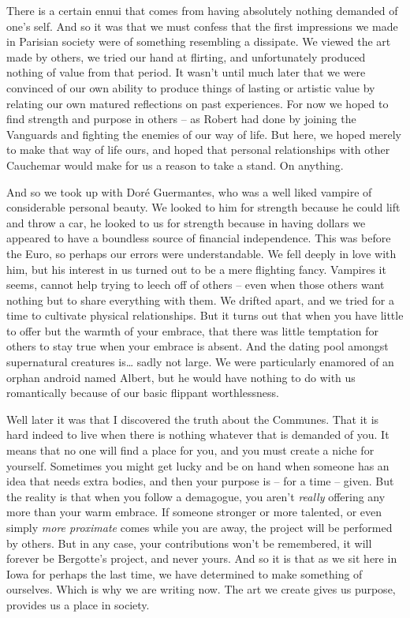 There is a certain ennui that comes from having absolutely nothing demanded of one's self. And so it was that we must confess that the first impressions we made in Parisian society were of something resembling a dissipate. We viewed the art made by others, we tried our hand at flirting, and unfortunately produced nothing of value from that period. It wasn't until much later that we were convinced of our own ability to produce things of lasting or artistic value by relating our own matured reflections on past experiences. For now we hoped to find strength and purpose in others -- as Robert had done by joining the Vanguards and fighting the enemies of our way of life. But here, we hoped merely to make that way of life ours, and hoped that personal relationships with other Cauchemar would make for us a reason to take a stand. On anything.

And so we took up with Dor\'{e} Guermantes, who was a well liked vampire of considerable personal beauty. We looked to him for strength because he could lift and throw a car, he looked to us for strength because in having dollars we appeared to have a boundless source of financial independence. This was before the Euro, so perhaps our errors were understandable. We fell deeply in love with him, but his interest in us turned out to be a mere flighting fancy. Vampires it seems, cannot help trying to leech off of others -- even when those others want nothing but to share everything with them. We drifted apart, and we tried for a time to cultivate physical relationships. But it turns out that when you have little to offer but the warmth of your embrace, that there was little temptation for others to stay true when your embrace is absent. And the dating pool amongst supernatural creatures is\ldots{} sadly not large. We were particularly enamored of an orphan android named Albert, but he would have nothing to do with us romantically because of our basic flippant worthlessness.

Well later it was that I discovered the truth about the Communes. That it is hard indeed to live when there is nothing whatever that is demanded of you. It means that no one will find a place for you, and you must create a niche for yourself. Sometimes you might get lucky and be on hand when someone has an idea that needs extra bodies, and then your purpose is -- for a time -- given. But the reality is that when you follow a demagogue, you aren't \textit{really} offering any more than your warm embrace. If someone stronger or more talented, or even simply \textit{more proximate} comes while you are away, the project will be performed by others. But in any case, your contributions won't be remembered, it will forever be Bergotte's project, and never yours. And so it is that as we sit here in Iowa for perhaps the last time, we have determined to make something of ourselves. Which is why we are writing now. The art we create gives us purpose, provides us a place in society.


